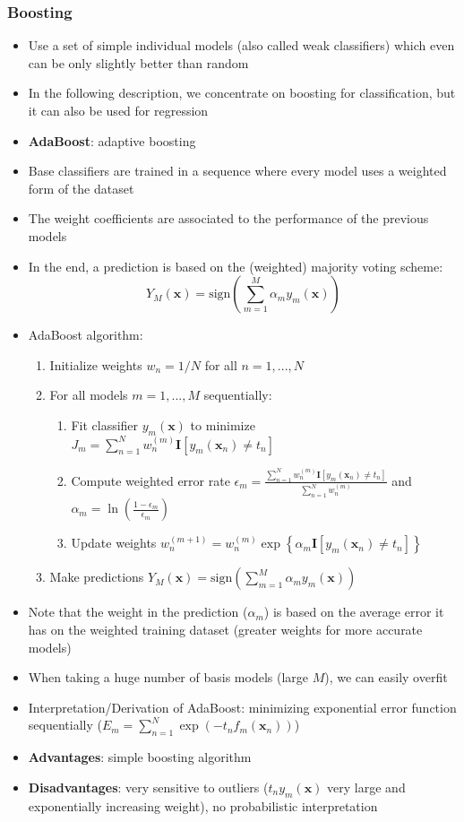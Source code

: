 \subsubsection{Boosting}
\begin{itemize}
	\item Use a set of simple individual models (also called weak classifiers) which even can be only slightly better than random
	\item In the following description, we concentrate on boosting for classification, but it can also be used for regression
	\item \textbf{AdaBoost}: adaptive boosting
	\item Base classifiers are trained in a sequence where every model uses a weighted form of the dataset
	\item The weight coefficients are associated to the performance of the previous models
	\item In the end, a prediction is based on the (weighted) majority voting scheme:
	$$Y_M(\bm{x}) = \text{sign}\left(\sum\limits_{m=1}^{M}\alpha_m y_m(\bm{x})\right)$$
	\item AdaBoost algorithm:
	\begin{enumerate}
		\item Initialize weights $w_n = 1/N$ for all $n=1, ...,N$
		\item For all models $m=1,...,M$ sequentially:
		\begin{enumerate}
			\item Fit classifier $y_m(\bm{x})$ to minimize $J_m = \sum\limits_{n=1}^{N} w_n^{(m)} \bm{I}[y_m(\bm{x}_n)\neq t_n]$
			\item Compute weighted error rate $\epsilon_m = \frac{\sum_{n=1}^{N}w_n^{(m)}\bm{I}[y_m(\bm{x}_n)\neq t_n]}{\sum_{n=1}^{N}w_n^{(m)}}$ and $\alpha_m = \ln\left(\frac{1-\epsilon_m}{\epsilon_m}\right)$
			\item Update weights $w_n^{(m+1)} = w_n^{(m)}\exp\left\{\alpha_m \bm{I}\left[y_m(\bm{x}_n)\neq t_n\right]\right\}$
		\end{enumerate}
		\item Make predictions $Y_M(\bm{x}) = \text{sign}\left(\sum\limits_{m=1}^{M}\alpha_m y_m(\bm{x})\right)$
	\end{enumerate}
	\item Note that the weight in the prediction ($\alpha_m$) is based on the average error it has on the weighted training dataset (greater weights for more accurate models)
	\item When taking a huge number of basis models (large $M$), we can easily overfit
	\item Interpretation/Derivation of AdaBoost: minimizing exponential error function sequentially ($E_m = \sum_{n=1}^{N}\exp\left(-t_n f_m(\bm{x}_n)\right)$)
	\item \textbf{Advantages}: simple boosting algorithm
	\item \textbf{Disadvantages}: very sensitive to outliers ($t_n y_m(\bm{x})$ very large and exponentially increasing weight), no probabilistic interpretation
\end{itemize}
